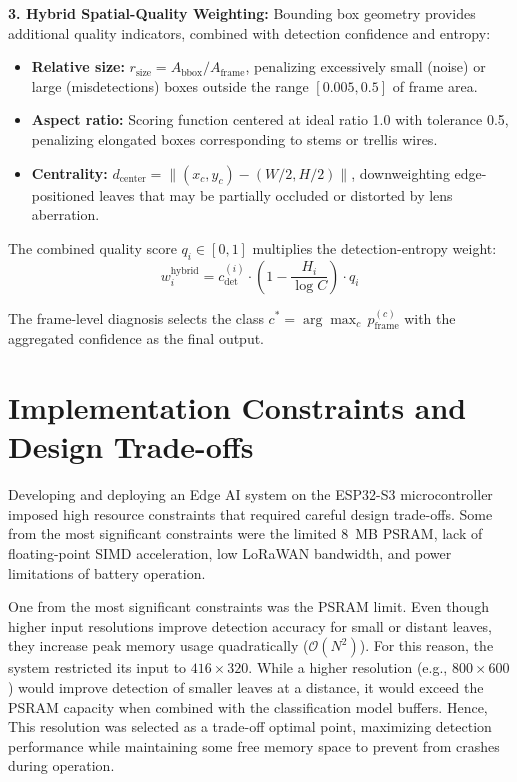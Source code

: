 \textbf{3. Hybrid Spatial-Quality Weighting:} Bounding box geometry provides additional quality indicators, combined with detection confidence and entropy:

\begin{itemize}
    \item \textbf{Relative size:} $r_{\text{size}} = A_{\text{bbox}} / A_{\text{frame}}$, penalizing excessively small (noise) or large (misdetections) boxes outside the range $[0.005, 0.5]$ of frame area.
    \item \textbf{Aspect ratio:} Scoring function centered at ideal ratio 1.0 with tolerance 0.5, penalizing elongated boxes corresponding to stems or trellis wires.
    \item \textbf{Centrality:} $d_{\text{center}} = \|(x_c, y_c) - (W/2, H/2)\|$, downweighting edge-positioned leaves that may be partially occluded or distorted by lens aberration.
\end{itemize}

The combined quality score $q_i \in [0, 1]$ multiplies the detection-entropy weight:
\begin{equation}
w_i^{\text{hybrid}} = c_{\text{det}}^{(i)} \cdot \left(1 - \frac{H_i}{\log C}\right) \cdot q_i
\end{equation}

The frame-level diagnosis selects the class $c^* = \arg\max_c\, p_{\text{frame}}^{(c)}$ with the aggregated confidence as the final output.

\section{Implementation Constraints and Design Trade-offs}
\label{sec:implementation_constraints}

Developing and deploying an Edge AI system on the ESP32-S3 microcontroller imposed high resource constraints that required careful design trade-offs. Some from the most significant constraints were the limited 8~MB PSRAM, lack of floating-point SIMD acceleration, low LoRaWAN bandwidth, and power limitations of battery operation.

One from the most significant constraints was the PSRAM limit. Even though higher input resolutions improve detection accuracy for small or distant leaves, they increase peak memory usage quadratically ($\mathcal{O}(N^2)$). For this reason, the system restricted its input to $416 \times 320$. While a higher resolution (e.g., $800 \times 600$) would improve detection of smaller leaves at a distance, it would exceed the PSRAM capacity when combined with the classification model buffers. Hence, This resolution was selected as a trade-off optimal point, maximizing detection performance while maintaining some free memory space to prevent from crashes during operation. 

